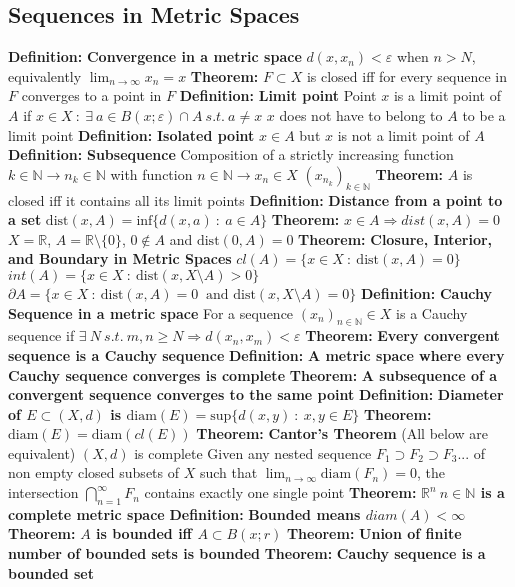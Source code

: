 \documentclass[14pt]{extarticle}
\def\Definition{{\color{Blue} \textbf{Definition:} }}
\def\Theorem{{\color{Red} \textbf{Theorem:} }}
\begin{document}
\begin{outline}
		\section{Sequences in Metric Spaces}
		\1	\Definition \textbf{Convergence in a metric space}
			\2	$d(x,x_n) < \varepsilon$ when $n > N$, equivalently $\lim_{n \rightarrow \infty} x_n = x$
			\2	\Theorem	$F \subset X$ is closed iff for every sequence in $F$ converges
										to a point in $F$
		\1	\Definition \textbf{Limit point}
			\2	Point $x$ is a limit point of $A$ if $x \in X~:~\exists~a \in B(x;\varepsilon) \cap A~s.t.~a \ne x$
			\2	$x$ does not have to belong to $A$ to be a limit point
		\1	\Definition \textbf{Isolated point}
			\2	$x \in A$ but $x$ is not a limit point of $A$
		\1	\Definition \textbf{Subsequence}
			\2	Composition of a strictly increasing function $k \in \mathbb{N} \rightarrow n_k \in \mathbb{N}$
					with function $n \in \mathbb{N} \rightarrow x_n \in X$
			\2	$(x_{n_k})_{k \in \mathbb{N}}$
		\1	\Theorem $A$ is closed iff it contains all its limit points
		\1	\Definition \textbf{Distance from a point to a set}	
			\2	$\text{dist}(x,A) = \text{inf}\{d(x,a)~:~a \in A\}$
			\2	\Theorem	$x \in A \Rightarrow dist(x,A) = 0$
				\3	$X = \mathbb{R}$, $A = \mathbb{R} \setminus \{0\}$, $0 \notin A$ and $\text{dist}(0,A) = 0$
		\1	\Theorem \textbf{Closure, Interior, and Boundary in Metric Spaces}
			\2	$cl(A) = \{x \in X~:~\text{dist}(x,A) = 0\}$
			\2	$int(A) = \{x \in X~:~\text{dist}(x,X\setminus A) > 0\}$
			\2	$\partial A = \{x \in X~:~\text{dist}(x,A) = 0~\text{ and dist}(x,X\setminus A) = 0\}$
		\1	\Definition \textbf{Cauchy Sequence in a metric space}
			\2	For a sequence $(x_n)_{n \in \mathbb{N}} \in X$ is a Cauchy sequence 
					if $\exists~N~s.t.~m,n \ge N \Rightarrow d(x_n,x_m) < \varepsilon$
		\1	\Theorem	\textbf{Every convergent sequence is a Cauchy sequence}
		\1	\Definition \textbf{A metric space where every Cauchy sequence converges is complete}
		\1	\Theorem \textbf{A subsequence of a convergent sequence converges to the same point}
		\1	\Definition \textbf{Diameter of $E \subset (X,d)$ is $\text{diam}(E) = \text{sup}\{d(x,y) ~:~x,y \in E\}$}
		\1	\Theorem	$\text{diam}(E) = \text{diam}(cl(E))$
		\1	\Theorem	\textbf{Cantor's Theorem} (All below are equivalent)
			\2	$(X,d)$ is complete
			\2	Given any nested sequence $F_1 \supset F_2 \supset F_3 ...$ of non
					empty closed subsets of $X$ such that $\lim_{n \rightarrow \infty} \text{diam}(F_n) = 0$, 
					the intersection $\bigcap_{n=1}^{\infty} F_n$ contains exactly one single point
		\1	\Theorem	\textbf{$\mathbb{R}^n~n \in \mathbb{N}$ is a complete metric space}
		\1	\Definition \textbf{Bounded means $diam(A) < \infty$}
		\1	\Theorem \textbf{$A$ is bounded iff $A \subset B(x;r)$}
		\1	\Theorem \textbf{Union of finite number of bounded sets is bounded}
		\1	\Theorem \textbf{Cauchy sequence is a bounded set}

\end{outline}
\end{document}
